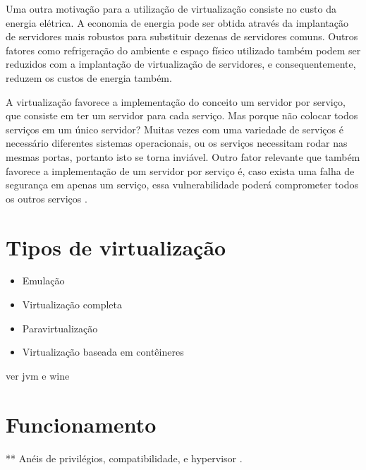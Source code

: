 Uma outra motivação para a utilização de virtualização consiste no custo da energia elétrica. A economia de energia pode ser obtida através 
da implantação de servidores mais robustos para substituir dezenas de servidores comuns. Outros fatores como refrigeração do ambiente e 
espaço físico utilizado também podem ser reduzidos com a implantação de virtualização de servidores, e consequentemente, reduzem os 
custos de energia também.

A virtualização favorece a implementação do conceito um servidor por serviço, que consiste em ter um servidor para cada serviço.
Mas porque não colocar todos serviços em um único servidor? Muitas vezes com uma variedade de serviços é necessário diferentes 
sistemas operacionais, ou os serviços necessitam rodar nas mesmas portas, portanto isto se torna inviável. Outro fator relevante que 
também favorece a implementação de um servidor por serviço é, caso exista uma falha de segurança em apenas um serviço, essa 
vulnerabilidade poderá comprometer todos os outros serviços 
\cite{carissimi2008}.

\section{Tipos de virtualização}
\label{section:tiposvirt}

\begin{itemize}
 \item Emulação
 \item Virtualização completa
 \item Paravirtualização
 \item Virtualização baseada em contêineres
\end{itemize}

ver jvm e wine

\section{Funcionamento}
\label{section:funcionamentovirt}

** Anéis de privilégios, compatibilidade, e hypervisor \cite{goncalves2009}.



